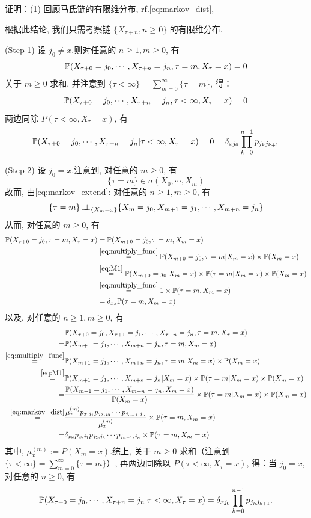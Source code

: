 证明：(1) 回顾马氏链的有限维分布, rf.\eqref{eq:markov_dist}, 

根据此结论, 我们只需考察链 \(\{X_{\tau + n}, n \geq 0\}\) 的有限维分布.

(Step 1) 设 \(j_0 \neq x\).则对任意的 \(n \geq 1, m \geq 0\), 有
\[
\mathbb{P}(X_{\tau + 0} = j_0, \cdots, X_{\tau + n} = j_n, \tau = m, X_\tau = x) = 0
\]
关于 \(m \geq 0\) 求和, 并注意到 \(\{\tau < \infty\} = \sum_{m=0}^{\infty} \{\tau = m\}\), 得：
\[
\mathbb{P}(X_{\tau + 0} = j_0, \cdots, X_{\tau + n} = j_n, \tau < \infty, X_\tau = x) = 0
\]
两边同除 \(P(\tau < \infty, X_\tau = x)\), 有
\[
\mathbb{P}(X_{\tau + 0} = j_0, \cdots, X_{\tau + n} = j_n | \tau < \infty, X_\tau = x) = 0 = \delta_{x j_0} \prod_{k=0}^{n-1} p_{j_k j_{k+1}}
\]

(Step 2) 设 \(j_0 = x\).注意到, 对任意的 \(m \geq 0\), 有
\[
\{\tau = m\} \in \sigma(X_0, \cdots, X_m)
\]
故而, 由\eqref{eq:markov_extend}: 对任意的 \(n \geq 1, m \geq 0\), 有
\[
\{\tau = m\} \operatorname{\perp\!\!\!\perp}_{\{X_m = x\}} \{X_m = j_0, X_{m+1} = j_1, \cdots, X_{m+n} = j_n\}
\]
从而, 对任意的 \(m \geq 0\), 有
\[
\begin{aligned}
\mathbb{P}(X_{\tau + 0} = j_0, \tau = m, X_\tau = x) &= \mathbb{P}(X_{m + 0} = j_0, \tau = m, X_m = x)\\
&\overset{\eqref{eq:multiply_func}}{=}\mathbb{P}(X_{m + 0} = j_0, \tau = m| X_m = x) \times \mathbb{P}(X_m = x)\\
&\overset{\eqref{eq:M1}}{=}\mathbb{P}(X_{m + 0} = j_0 | X_m = x) \times \mathbb{P}(\tau=m|X_m = x)\times \mathbb{P}(X_m=x)\\
&\overset{\eqref{eq:multiply_func}}{=}1\times \mathbb{P}(\tau=m,X_m=x)\\
&=\delta_{xx}\mathbb{P}(\tau=m,X_m=x)
\end{aligned}
\]
以及, 对任意的 \(n \geq 1, m \geq 0\), 有
\[
\begin{aligned}
&\mathbb{P}(X_{\tau + 0} = j_0, X_{\tau + 1} = j_1, \cdots, X_{\tau + n} = j_n, \tau = m, X_\tau = x)\\
=& \mathbb{P}(X_{m + 1} = j_1, \cdots, X_{m + n} = j_n, \tau = m, X_m = x)\\
\overset{\eqref{eq:multiply_func}}{=}& \mathbb{P}(X_{m + 1} = j_1, \cdots, X_{m + n} = j_n, \tau = m | X_m = x) \times \mathbb{P}(X_m = x)\\
\overset{\eqref{eq:M1}}{=}& \mathbb{P}(X_{m + 1} = j_1, \cdots, X_{m + n} = j_n | X_m = x) \times \mathbb{P}(\tau=m|X_m = x)\times \mathbb{P}(X_m=x)\\
=& \frac{\mathbb{P}(X_{m + 1} = j_1, \cdots, X_{m + n} = j_n , X_m = x)}{\mathbb{P}(X_m=x)}\times \mathbb{P}(\tau=m|X_m = x)\times \mathbb{P}(X_m=x)\\
\overset{\eqref{eq:markov_dist}}{=}&\frac{\mu_x^{(m)}p_{x,j_1}p_{j_2,j_3}\cdots p_{j_{n-1},j_n}}{\mu_x^{(m)}}\times \mathbb{P}(\tau=m,X_m=x)\\
=&\delta_{xx}p_{x,j_1}p_{j_2,j_3}\cdots p_{j_{n-1},j_n}\times \mathbb{P}(\tau=m,X_m=x)
\end{aligned}
\]
其中, \(\mu_x^{(m)} := P(X_m = x)\).综上, 关于 \(m \geq 0\) 求和（注意到 \(\{\tau < \infty\} = \sum_{m=0}^{\infty} \{\tau = m\}\)）, 再两边同除以 \(P(\tau < \infty, X_\tau = x)\), 得：当 \(j_0 = x\), 对任意的 \(n \geq 0\), 有
\[
\mathbb{P}(X_{\tau + 0} = j_0, \cdots, X_{\tau + n} = j_n | \tau < \infty, X_\tau = x) = \delta_{x j_0} \prod_{k=0}^{n-1} p_{j_k j_{k+1}}.
\]

